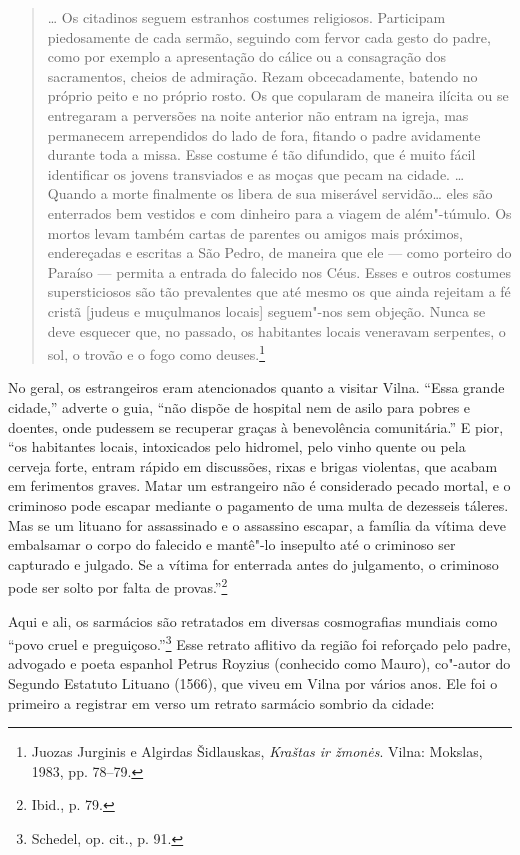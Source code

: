 \begin{quote}
\ldots{} Os citadinos seguem estranhos costumes religiosos. Participam
piedosamente de cada sermão, seguindo com fervor cada gesto do padre,
como por exemplo a apresentação do cálice ou a consagração dos
sacramentos, cheios de admiração. Rezam obcecadamente, batendo no
próprio peito e no próprio rosto. Os que copularam de maneira ilícita ou
se entregaram a perversões na noite anterior não entram na igreja, mas
permanecem arrependidos do lado de fora, fitando o padre avidamente
durante toda a missa. Esse costume é tão difundido, que é muito fácil
identificar os jovens transviados e as moças que pecam na cidade.
\ldots{} Quando a morte finalmente os libera de sua miserável
servidão\ldots{} eles são enterrados bem vestidos e com dinheiro para a
viagem de além"-túmulo. Os mortos levam também cartas de parentes ou
amigos mais próximos, endereçadas e escritas a São Pedro, de maneira que
ele --- como porteiro do Paraíso --- permita a entrada do falecido nos Céus.
Esses e outros costumes supersticiosos são tão prevalentes que até mesmo
os que ainda rejeitam a fé cristã {[}judeus e muçulmanos locais{]}
seguem"-nos sem objeção. Nunca se deve esquecer que, no passado, os
habitantes locais veneravam serpentes, o sol, o trovão e o fogo como
deuses.\footnote{Juozas Jurginis e Algirdas Šidlauskas, \textit{Kraštas ir žmonės}. Vilna: Mokslas, 1983, pp. 78--79.}
\end{quote}

\asterisc

No geral, os estrangeiros eram atencionados quanto a visitar Vilna.
``Essa grande cidade,'' adverte o guia, ``não dispõe de hospital nem de
asilo para pobres e doentes, onde pudessem se recuperar graças à
benevolência comunitária.'' E pior, ``os habitantes locais, intoxicados
pelo hidromel, pelo vinho quente ou pela cerveja forte, entram rápido em
discussões, rixas e brigas violentas, que acabam em ferimentos graves.
Matar um estrangeiro não é considerado pecado mortal, e o criminoso pode
escapar mediante o pagamento de uma multa de dezesseis táleres. Mas se
um lituano for assassinado e o assassino escapar, a família da vítima
deve embalsamar o corpo do falecido e mantê"-lo insepulto até o criminoso
ser capturado e julgado. Se a vítima for enterrada antes do julgamento,
o criminoso pode ser solto por falta de provas.''\footnote{Ibid., p. 79.}

Aqui e ali, os sarmácios são retratados em diversas cosmografias
mundiais como ``povo cruel e preguiçoso.''\footnote{Schedel, op. cit., p. 91.} Esse retrato aflitivo da região foi reforçado pelo padre, advogado e poeta espanhol Petrus Royzius (conhecido como Mauro),
co"-autor do Segundo Estatuto Lituano (1566), que viveu em Vilna por
vários anos. Ele foi o primeiro a registrar em verso um retrato sarmácio
sombrio da cidade:

